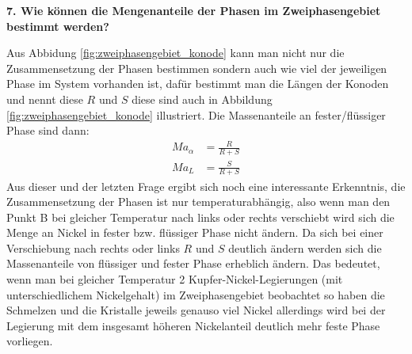 \noindent\textbf{7. Wie können die Mengenanteile der Phasen
im Zweiphasengebiet bestimmt werden?}\\
\begin{addmargin}[25pt]{0pt}
Aus Abbidung \ref{fig:zweiphasengebiet_konode} kann man nicht nur die Zusammensetzung der Phasen bestimmen sondern auch wie viel der jeweiligen Phase im System vorhanden ist, dafür bestimmt man die Längen der Konoden und nennt diese $R$ und $S$ diese sind auch in Abbildung \ref{fig:zweiphasengebiet_konode} illustriert. Die Massenanteile an fester/flüssiger Phase sind dann:
\begin{align}
    Ma_\alpha &= \frac{R}{R+S}\\
    Ma_L &= \frac{S}{R+S}
\end{align}
Aus dieser und der letzten Frage ergibt sich noch eine interessante Erkenntnis, die Zusammensetzung der Phasen ist nur temperaturabhängig, also wenn man den Punkt B bei gleicher Temperatur nach links oder rechts verschiebt wird sich die Menge an Nickel in fester bzw. flüssiger Phase nicht ändern. Da sich bei einer Verschiebung nach rechts oder links $R$ und $S$ deutlich ändern werden sich die Massenanteile von flüssiger und fester Phase erheblich ändern. Das bedeutet, wenn man bei gleicher Temperatur 2 Kupfer-Nickel-Legierungen (mit unterschiedlichem Nickelgehalt) im Zweiphasengebiet beobachtet so haben die Schmelzen und die Kristalle jeweils genauso viel Nickel allerdings wird bei der Legierung mit dem insgesamt höheren Nickelanteil deutlich mehr feste Phase vorliegen.\\  
\end{addmargin}

